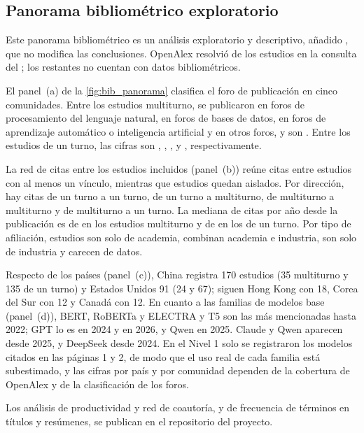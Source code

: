 \subsection{Panorama bibliométrico exploratorio}
\label{sec:res-bibliometria}

Este panorama bibliométrico es un análisis exploratorio y descriptivo, añadido , que no modifica las conclusiones. OpenAlex resolvió \nResueltosOA{} de los \nEstudios{} estudios en la consulta del \fechaOpenalex{}; los \nNoResueltosOA{} restantes no cuentan con datos bibliométricos.



El panel~(a) de la \cref{fig:bib_panorama} clasifica el foro de publicación en cinco comunidades. Entre los estudios multiturno, \nComunidadPlnMT{} se publicaron en foros de procesamiento del lenguaje natural, \nComunidadBasesDatosMT{} en foros de bases de datos, \nComunidadAprendizajeMT{} en foros de aprendizaje automático o inteligencia artificial y \nComunidadOtraMT{} en otros foros, y \nComunidadPreprintMT{} son . Entre los estudios de un turno, las cifras son \nComunidadPlnUT{}, \nComunidadBasesDatosUT{}, \nComunidadAprendizajeUT{}, \nComunidadOtraUT{} y \nComunidadPreprintUT{}, respectivamente.

La red de citas entre los estudios incluidos (panel~(b)) reúne \nCitasRed{} citas entre \nConVinculo{} estudios con al menos un vínculo, mientras que \nAislados{} estudios quedan aislados. Por dirección, hay \nCitasUTUT{} citas de un turno a un turno, \nCitasUTMT{} de un turno a multiturno, \nCitasMTMT{} de multiturno a multiturno y \nCitasMTUT{} de multiturno a un turno. La mediana de citas por año desde la publicación es de \citasMedMT{} en los estudios multiturno y de \citasMedUT{} en los de un turno. Por tipo de afiliación, \nAfilAcademia{} estudios son solo de academia, \nAfilMixta{} combinan academia e industria, \nAfilIndustria{} son solo de industria y \nAfilSinDatos{} carecen de datos.

Respecto de los países (panel~(c)), China registra 170 estudios (35 multiturno y 135 de un turno) y Estados Unidos 91 (24 y 67); siguen Hong Kong con 18, Corea del Sur con 12 y Canadá con 12. En cuanto a las familias de modelos base (panel~(d)), BERT, RoBERTa y ELECTRA y T5 son las más mencionadas hasta 2022; GPT lo es en 2024 y en 2026, y Qwen en 2025. Claude y Qwen aparecen desde 2025, y DeepSeek desde 2024. En el Nivel 1 solo se registraron los modelos citados en las páginas 1 y 2, de modo que el uso real de cada familia está subestimado, y las cifras por país y por comunidad dependen de la cobertura de OpenAlex y de la clasificación de los foros.

Los análisis de productividad y red de coautoría, y de frecuencia de términos en títulos y resúmenes, se publican en el repositorio del proyecto.

